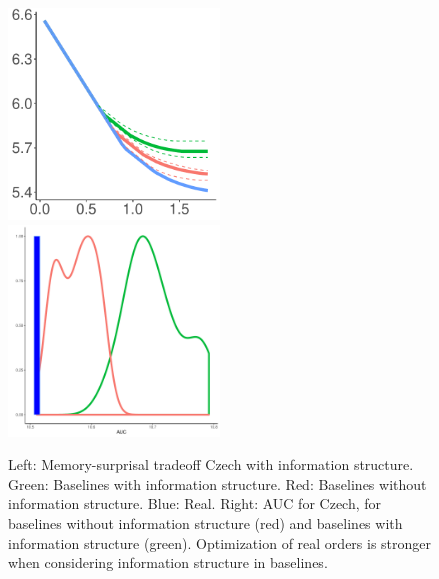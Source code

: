 	
\begin{figure}
\includegraphics[width=0.5\textwidth]{figures/Czech-PDT-listener-surprisal-memory-MEDIANS_onlyWordForms_boundedVocab.pdf}
\includegraphics[width=0.5\textwidth]{figures/Czech-PDT-listener-surprisal-memory-HIST_AUC_onlyWordForms_boundedVocab_REAL-infostruc.pdf}

	\caption{Left: Memory-surprisal tradeoff Czech with information structure. Green: Baselines with information structure. Red: Baselines without information structure. Blue: Real. Right: AUC for Czech, for baselines without information structure (red) and baselines with information structure (green). Optimization of real orders is stronger when considering information structure in baselines. }\label{fig:median-czech-infostruc}
\end{figure}





